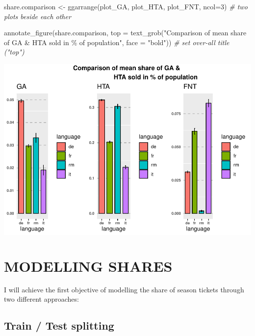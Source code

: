 \documentclass[
]{article}
\newenvironment{Shaded}{\begin{snugshade}}{\end{snugshade}}
\newcommand{\AttributeTok}[1]{\textcolor[rgb]{0.77,0.63,0.00}{#1}}
\newcommand{\CommentTok}[1]{\textcolor[rgb]{0.56,0.35,0.01}{\textit{#1}}}
\newcommand{\DecValTok}[1]{\textcolor[rgb]{0.00,0.00,0.81}{#1}}
\newcommand{\FunctionTok}[1]{\textcolor[rgb]{0.00,0.00,0.00}{#1}}
\newcommand{\NormalTok}[1]{#1}
\newcommand{\OtherTok}[1]{\textcolor[rgb]{0.56,0.35,0.01}{#1}}
\newcommand{\StringTok}[1]{\textcolor[rgb]{0.31,0.60,0.02}{#1}}
\begin{document}
\begin{Shaded}
\begin{Highlighting}[]
\NormalTok{share.comparison }\OtherTok{\textless{}{-}} \FunctionTok{ggarrange}\NormalTok{(plot\_GA, plot\_HTA, plot\_FNT, }\AttributeTok{ncol=}\DecValTok{3}\NormalTok{) }\CommentTok{\# two plots beside each other}

\FunctionTok{annotate\_figure}\NormalTok{(share.comparison, }
                \AttributeTok{top =} \FunctionTok{text\_grob}\NormalTok{(}\StringTok{"Comparison of mean share of GA \& }
\StringTok{                                HTA sold in \% of population"}\NormalTok{, }
                                \AttributeTok{face =} \StringTok{"bold"}\NormalTok{)) }\CommentTok{\# set over{-}all title ("top")}
\end{Highlighting}
\end{Shaded}

\includegraphics{Lin_Mod_Clus_Anal_files/figure-latex/unnamed-chunk-15-1.pdf}

\newpage

\hypertarget{modelling-shares}{%
\section{MODELLING SHARES}\label{modelling-shares}}

I will achieve the first objective of modelling the share of season
tickets through two different approaches:

\hypertarget{train-test-splitting}{%
\subsection{Train / Test splitting}\label{train-test-splitting}}
\end{document}
